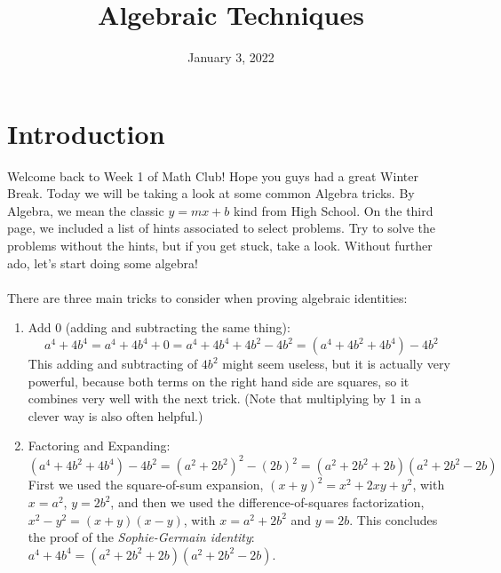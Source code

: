\documentclass{article}
\title{Algebraic Techniques}
\author{}
\date{January 3, 2022}
\begin{document}
\section{Introduction}

Welcome back to Week 1 of Math Club! Hope you guys had a great Winter Break. Today we will be taking a look at some common Algebra tricks. By Algebra, we mean the classic $y = mx + b$ kind from High School.
On the third page, we included a list of hints associated to select problems.
Try to solve the problems without the hints, but if you get stuck, take a look.
Without further ado, let's start doing some algebra! \\\\
There are three main tricks to consider when proving algebraic identities:
\begin{enumerate}[label=\Roman*.]
    \item Add \(0\) (adding and subtracting the same thing): \[a^4+4b^4 = a^4 + 4b^4 + 0 = a^4 + 4b^4 + 4b^2-4b^2 = (a^4+ 4b^2 + 4b^4) - 4b^2\]
    This adding and subtracting of $4b^2$ might seem useless, but it is actually very powerful, because both terms on the right hand side are squares, so it combines very well with the next trick.
    (Note that multiplying by 1 in a clever way is also often helpful.)
    \item Factoring and Expanding: 
    \[(a^4 + 4b^2 + 4b^4) - 4b^2 = (a^2+2b^2)^2 - (2b)^2 = (a^2 + 2b^2 + 2b)(a^2+2b^2-2b)\]
    First we used the square-of-sum expansion, $(x+y)^2 = x^2 + 2xy + y^2$, with $x=a^2$, $y=2b^2$, and then we used the difference-of-squares factorization, $x^2-y^2 = (x+y)(x-y)$, with $x=a^2+2b^2$ and $y=2b$. This concludes the proof of the \emph{Sophie-Germain identity}: $a^4+4b^4 = (a^2+2b^2 + 2b)(a^2+2b^2-2b)$.
    

\end{enumerate}
\end{document}
